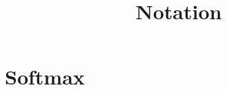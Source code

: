 \documentclass{article}
\title{Notation}
\begin{document}
\section{Softmax}

\begin{equation}
\end{equation}
\end{document}
